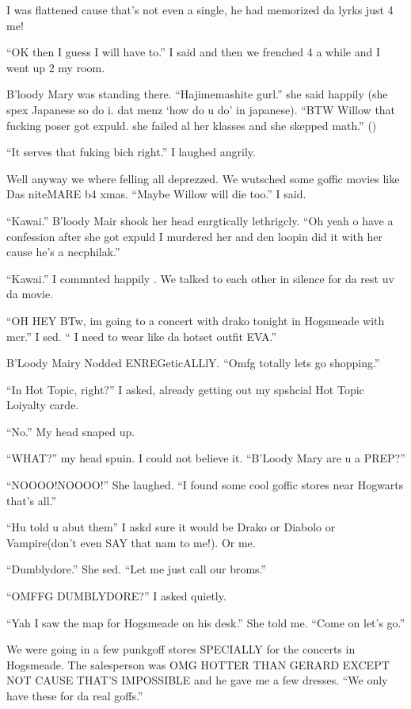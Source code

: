 I was flattened cause that's not even a single, he had memorized da lyrks just 4 me!

\enquote{OK then I guess I will have to.} I said and then we frenched 4 a while and I went up 2 my room.

B'loody Mary was standing there. \enquote{Hajimemashite gurl.} she said happily (she spex Japanese so do i. dat menz \enquote*{how do u do} in japanese). \enquote{BTW Willow that fucking poser got expuld. she failed al her klasses and she skepped math.} ()

\enquote{It serves that fuking bich right.} I laughed angrily.

Well anyway we where felling all deprezzed. We wutsched some goffic movies like Das niteMARE b4 xmas. \enquote{Maybe Willow will die too.} I said.

\enquote{Kawai.} B'loody Mair shook her head enrgtically lethrigcly. \enquote{Oh yeah o have a confession after she got expuld I murdered her and den loopin did it with her cause he's a necphilak.}

\enquote{Kawai.} I commnted happily . We talked to each other in silence for da rest uv da movie.

\enquote{OH HEY BTw, im going to a concert with drako tonight in Hogsmeade with mcr.} I sed. \enquote{ I need to wear like da hotset outfit EVA\@.}

B'Loody Mairy Nodded ENREGeticALLlY\@. \enquote{Omfg totally lets go shopping.}

\enquote{In Hot Topic, right?} I asked, already getting out my spshcial Hot Topic Loiyalty carde.

\enquote{No.} My head snaped up.

\enquote{WHAT\@?} my head spuin. I could not believe it. \enquote{B'Loody Mary are u a PREP\@?}

\enquote{NOOOO!NOOOO\@!} She laughed. \enquote{I found some cool goffic stores near Hogwarts that's all.}

\enquote{Hu told u abut them} I askd sure it would be Drako or Diabolo or Vampire(don't even SAY that nam to me!). Or me.

\enquote{Dumblydore.} She sed. \enquote{Let me just call our broms.}

\enquote{OMFFG DUMBLYDORE\@?} I asked quietly.

\enquote{Yah I saw the map for Hogsmeade on his desk.} She told me. \enquote{Come on let's go.}

We were going in a few punkgoff stores SPECIALLY for the concerts in Hogsmeade. The salesperson was OMG HOTTER THAN GERARD EXCEPT NOT CAUSE THAT'S IMPOSSIBLE and he gave me a few dresses. \enquote{We only have these for da real goffs.}

